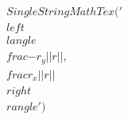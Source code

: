 \documentclass[preview]{standalone}
\begin{document}
\begin{align*}
SingleStringMathTex('\\left\\langle \\frac{-r_y}{||r||},\\frac{r_x}{||r||} \\right\\rangle')
\end{align*}
\end{document}
